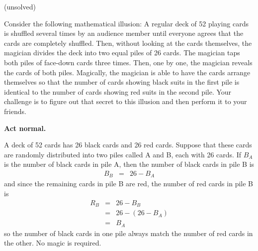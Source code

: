 \documentclass[answers]{exam}
\begin{document}
\begin{questions}
\begin{solution}
(unsolved)
\end{solution}

\question %
Consider the following mathematical illusion: A regular deck of 52 playing cards is shuffled several times by an audience member until everyone agrees that the cards are completely shuffled. Then, without looking at the cards themselves, the magician divides the deck into two equal piles of 26 cards. The magician taps both piles of face-down cards three times. Then, one by one, the magician reveals the cards of both piles. Magically, the magician is able to have the cards arrange themselves so that the number of cards showing black suits in the first pile is identical to the number of cards showing red suits in the second pile. Your challenge is to figure out that secret to this illusion and then perform it to your friends.

\begin{solution}
\textbf{Act normal.}

A deck of 52 cards has 26 black cards and 26 red cards. Suppose that these cards are randomly distributed into two piles called A and B, each with 26 cards. If $B_A$ is the number of black cards in pile A, then the number of black cards in pile B is 
\begin{eqnarray*}
B_B &=& 26 - B_A
\end{eqnarray*}
and since the remaining cards in pile B are red, the number of red cards in pile B is
\begin{eqnarray*}
R_B &=& 26 - B_B \\
	&=& 26 - (26 - B_A) \\
	&=& B_A
\end{eqnarray*}
so the number of black cards in one pile always match the number of red cards in the other. No magic is required.
\end{solution}


\end{questions}
\end{document}
